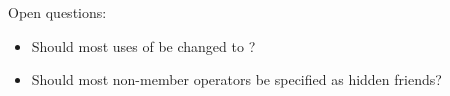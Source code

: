 \vspace{1.5cm}

Open questions:
\begin{itemize}
\item Should most uses of  be changed to ?
\item Should most non-member operators be specified as hidden friends?
\end{itemize}

\newpage


{}
\hypertarget{toctarget}{\tableofcontents*}

\setcounter{tocdepth}{5}

%
